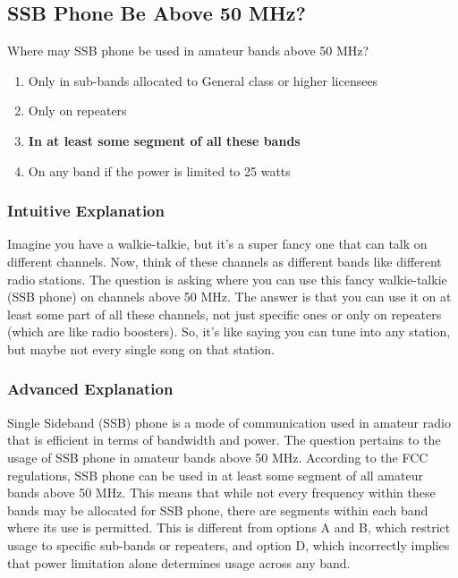 \subsection{SSB Phone Be Above 50 MHz?}
\label{T1B10}

\begin{tcolorbox}[colback=gray!10!white,colframe=black!75!black,title=T1B10]
Where may SSB phone be used in amateur bands above 50 MHz?
\begin{enumerate}[label=\Alph*)]
    \item Only in sub-bands allocated to General class or higher licensees
    \item Only on repeaters
    \item \textbf{In at least some segment of all these bands}
    \item On any band if the power is limited to 25 watts
\end{enumerate}
\end{tcolorbox}

\subsubsection{Intuitive Explanation}
Imagine you have a walkie-talkie, but it's a super fancy one that can talk on different channels. Now, think of these channels as different bands like different radio stations. The question is asking where you can use this fancy walkie-talkie (SSB phone) on channels above 50 MHz. The answer is that you can use it on at least some part of all these channels, not just specific ones or only on repeaters (which are like radio boosters). So, it's like saying you can tune into any station, but maybe not every single song on that station.

\subsubsection{Advanced Explanation}
Single Sideband (SSB) phone is a mode of communication used in amateur radio that is efficient in terms of bandwidth and power. The question pertains to the usage of SSB phone in amateur bands above 50 MHz. According to the FCC regulations, SSB phone can be used in at least some segment of all amateur bands above 50 MHz. This means that while not every frequency within these bands may be allocated for SSB phone, there are segments within each band where its use is permitted. This is different from options A and B, which restrict usage to specific sub-bands or repeaters, and option D, which incorrectly implies that power limitation alone determines usage across any band.

